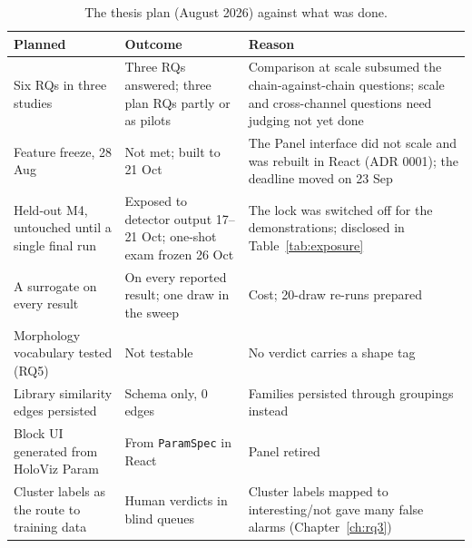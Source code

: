 \begin{table}[htbp]
\caption[{The thesis plan (August 2026) against what was done.}]{The thesis plan (August 2026) against what was done.}
\label{tab:planreview}
\footnotesize
\begin{tabularx}{\textwidth}{p{3.8cm} p{3.6cm} X}
\toprule
\textbf{Planned} & \textbf{Outcome} & \textbf{Reason}\\
\midrule
Six RQs in three studies & Three RQs answered; three plan RQs partly or as pilots & Comparison at scale subsumed the chain-against-chain questions; scale and cross-channel questions need judging not yet done\\
\addlinespace
Feature freeze, 28 Aug & Not met; built to 21 Oct & The Panel interface did not scale and was rebuilt in React (ADR 0001); the deadline moved on 23 Sep\\
\addlinespace
Held-out M4, untouched until a single final run & Exposed to detector output 17--21 Oct; one-shot exam frozen 26 Oct & The lock was switched off for the demonstrations; disclosed in Table~\ref{tab:exposure}\\
\addlinespace
A surrogate on every result & On every reported result; one draw in the sweep & Cost; 20-draw re-runs prepared\\
\addlinespace
Morphology vocabulary tested (RQ5) & Not testable & No verdict carries a shape tag\\
\addlinespace
Library similarity edges persisted & Schema only, 0 edges & Families persisted through groupings instead\\
\addlinespace
Block UI generated from HoloViz Param & From \texttt{ParamSpec} in React & Panel retired\\
\addlinespace
Cluster labels as the route to training data & Human verdicts in blind queues & Cluster labels mapped to interesting/not gave many false alarms (Chapter~\ref{ch:rq3})\\
\bottomrule
\end{tabularx}
\end{table}

